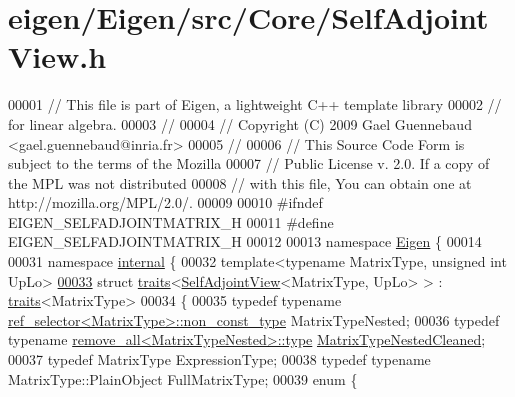 \hypertarget{eigen_2_eigen_2src_2_core_2_self_adjoint_view_8h_source}{}\section{eigen/\+Eigen/src/\+Core/\+Self\+Adjoint\+View.h}
\label{eigen_2_eigen_2src_2_core_2_self_adjoint_view_8h_source}

\begin{DoxyCode}
00001 \textcolor{comment}{// This file is part of Eigen, a lightweight C++ template library}
00002 \textcolor{comment}{// for linear algebra.}
00003 \textcolor{comment}{//}
00004 \textcolor{comment}{// Copyright (C) 2009 Gael Guennebaud <gael.guennebaud@inria.fr>}
00005 \textcolor{comment}{//}
00006 \textcolor{comment}{// This Source Code Form is subject to the terms of the Mozilla}
00007 \textcolor{comment}{// Public License v. 2.0. If a copy of the MPL was not distributed}
00008 \textcolor{comment}{// with this file, You can obtain one at http://mozilla.org/MPL/2.0/.}
00009 
00010 \textcolor{preprocessor}{#ifndef EIGEN\_SELFADJOINTMATRIX\_H}
00011 \textcolor{preprocessor}{#define EIGEN\_SELFADJOINTMATRIX\_H}
00012 
00013 \textcolor{keyword}{namespace }\hyperlink{namespace_eigen}{Eigen} \{ 
00014 
00031 \textcolor{keyword}{namespace }\hyperlink{namespaceinternal}{internal} \{
00032 \textcolor{keyword}{template}<\textcolor{keyword}{typename} MatrixType, \textcolor{keywordtype}{unsigned} \textcolor{keywordtype}{int} UpLo>
\hyperlink{struct_eigen_1_1internal_1_1traits_3_01_self_adjoint_view_3_01_matrix_type_00_01_up_lo_01_4_01_4}{00033} \textcolor{keyword}{struct }\hyperlink{struct_eigen_1_1internal_1_1traits}{traits}<\hyperlink{group___core___module_class_eigen_1_1_self_adjoint_view}{SelfAdjointView}<MatrixType, UpLo> > : \hyperlink{struct_eigen_1_1internal_1_1traits}{traits}<MatrixType>
00034 \{
00035   \textcolor{keyword}{typedef} \textcolor{keyword}{typename} \hyperlink{struct_eigen_1_1internal_1_1ref__selector}{ref\_selector<MatrixType>::non\_const\_type} 
      MatrixTypeNested;
00036   \textcolor{keyword}{typedef} \textcolor{keyword}{typename} \hyperlink{group___sparse_core___module}{remove\_all<MatrixTypeNested>::type} 
      \hyperlink{group___sparse_core___module}{MatrixTypeNestedCleaned};
00037   \textcolor{keyword}{typedef} MatrixType ExpressionType;
00038   \textcolor{keyword}{typedef} \textcolor{keyword}{typename} MatrixType::PlainObject FullMatrixType;
00039   \textcolor{keyword}{enum} \{

\end{DoxyCode}
